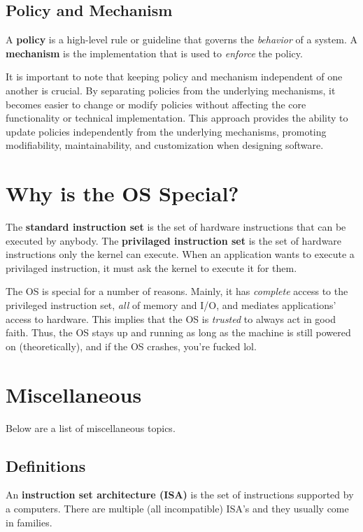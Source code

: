 \documentclass{report}
\begin{document}
\subsection*{Policy and Mechanism}
\label{subsubsec:PAM}
\begin{tcolorbox}[title=Definition: Policy and Mechanism]
  A \textbf{policy} is a high-level rule or guideline that governs the \textit{behavior} of a
  system.
  \tcblower
  A \textbf{mechanism} is the implementation that is used to \textit{enforce} the policy.
\end{tcolorbox}
It is important to note that keeping policy and mechanism independent of one another is crucial. By
separating policies from the underlying mechanisms, it becomes easier to change or modify policies
without affecting the core functionality or technical implementation. This approach provides the
ability to update policies independently from the underlying mechanisms, promoting modifiability,
maintainability, and customization when designing software.


\section{Why is the OS Special?}
\begin{tcolorbox}[title=Definition: Standard and Privileged Instruction Set]
  The \textbf{standard instruction set} is the set of hardware instructions that can be executed by anybody.
  \tcblower
  The \textbf{privilaged instruction set} is the set of hardware instructions only the kernel can
  execute. When an application wants to execute a privilaged instruction, it must ask the kernel to
  execute it for them.
\end{tcolorbox}

The OS is special for a number of reasons. Mainly, it has \textit{complete} access to the privileged
instruction set, \textit{all} of memory and I/O, and mediates applications' access to
hardware. This implies that the OS is \textit{trusted} to always act in good faith. Thus, the OS
stays up and running as long as the machine is still powered on (theoretically), and if the OS crashes,
you're fucked lol.


\section{Miscellaneous}
Below are a list of miscellaneous topics.
\subsection{Definitions}
\begin{tcolorbox}[title=Definition: Instruction Set Architectures]
  An \textbf{instruction set architecture (ISA)} is the set of instructions supported by a
  computers. There are multiple (all incompatible) ISA's and they usually come in families.
\end{tcolorbox}
\end{document}
